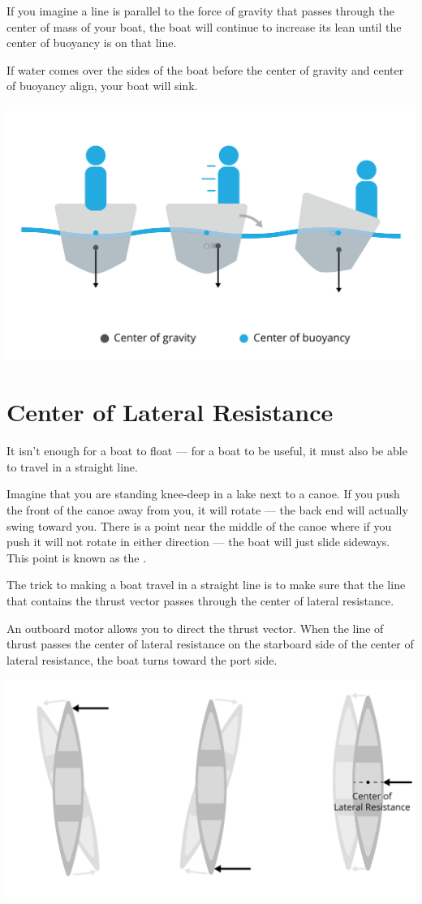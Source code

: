 If you imagine a line is parallel to the force of gravity that passes through the center of mass of your boat, the boat will continue to increase its lean until
the center of buoyancy is on that line.  

If water comes over the sides of the boat before the center of gravity and center of buoyancy align, your boat will sink.

\begin{center}
    \includegraphics[width=.75\textwidth]{cgcm.png}
    
\end{center}

\section{Center of Lateral Resistance}

It isn't enough for a boat to float --- for a boat to be useful,  it must also be able to travel in a straight line.

Imagine that you are standing knee-deep in a lake next to a canoe.  If you push the front of the canoe away from you,  it will rotate --- the back end will actually
swing toward you. There is a point near the middle of the canoe where if you push it will not rotate in either direction --- the boat will just slide sideways.  This point is known as the .

The trick to making a boat travel in a straight line is to make sure that the line that contains the thrust vector passes through the center of lateral resistance.

An outboard motor allows you to direct the thrust vector. When the line of thrust passes the center of lateral resistance on the starboard side of the center of lateral resistance, the boat turns toward the port side.

\begin{center}
    \includegraphics[width=.75\textwidth]{lateralResistance.png}
    
\end{center}

